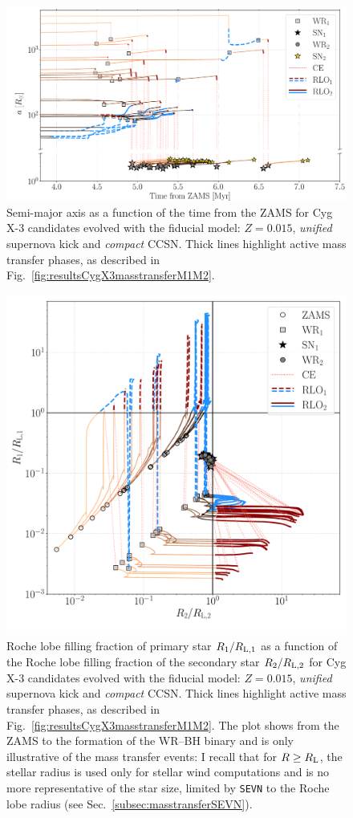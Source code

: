\documentclass[a4paper,titlepage]{book}     	%
\begin{document}
\begin{figure}[t!]
	\centering
	\includegraphics[width=\textwidth]{./images/BWorldtime_Semimajor_BHBH_GW_WRBH_cyg_x-3--Ko17.pdf}
	\caption{Semi-major axis as a function of the time from the ZAMS for Cyg X-3 candidates evolved with the fiducial model: $Z=0.015$, \emph{unified} supernova kick and \emph{compact} CCSN. Thick lines highlight active mass transfer phases, as described in Fig.\ \ref{fig:resultsCygX3masstransferM1M2}.}\label{fig:resultsCygX3masstransferSemimajor}
\end{figure}

\begin{figure}[b!]
		\centering
		\includegraphics[width=.7\textwidth]{./images/RLfill1_RLfill0_BHBH_GW_WRBH_cyg_x-3--Ko17.pdf}	
    \caption{Roche lobe filling fraction of primary star $R_1/R_{\rm L,1}$ as a function of the Roche lobe filling fraction of the secondary star $R_2/R_{\rm L,2}$ for Cyg X-3 candidates evolved with the fiducial model: $Z=0.015$, \emph{unified} supernova kick and \emph{compact} CCSN. Thick lines highlight active mass transfer phases, as described in Fig.\ \ref{fig:resultsCygX3masstransferM1M2}. The plot shows from the ZAMS to the formation of the WR--BH binary and is only illustrative of the mass transfer events: I recall that for $R \geq R_{\rm L}$, the stellar radius is used only for stellar wind computations and is no more representative of the star size, limited by \texttt{SEVN} to the Roche lobe radius (see Sec.\ \ref{subsec:masstransferSEVN}).}\label{fig:resultsCygX3masstransferRLfill}
\end{figure}
\end{document}
